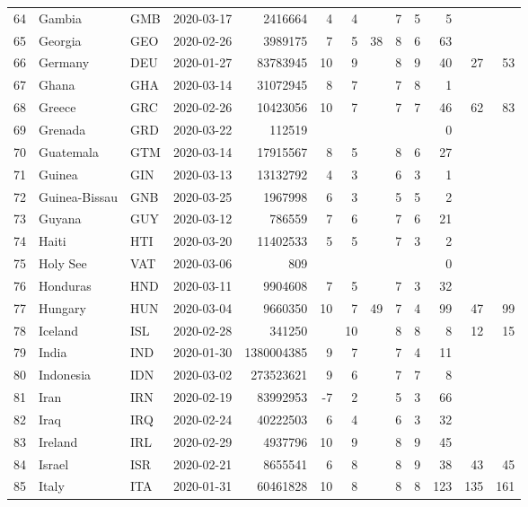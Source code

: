 \begin{longtable}{rlllrrrrrrrrr}
  64 & Gambia & GMB & 2020-03-17 & 2416664 & 4 & 4 &  & 7 & 5 & 5 &  &  \\ 
  65 & Georgia & GEO & 2020-02-26 & 3989175 & 7 & 5 & 38 & 8 & 6 & 63 &  &  \\ 
  66 & Germany & DEU & 2020-01-27 & 83783945 & 10 & 9 &  & 8 & 9 & 40 & 27 & 53 \\ 
  67 & Ghana & GHA & 2020-03-14 & 31072945 & 8 & 7 &  & 7 & 8 & 1 &  &  \\ 
  68 & Greece & GRC & 2020-02-26 & 10423056 & 10 & 7 &  & 7 & 7 & 46 & 62 & 83 \\ 
  69 & Grenada & GRD & 2020-03-22 & 112519 &  &  &  &  &  & 0 &  &  \\ 
  70 & Guatemala & GTM & 2020-03-14 & 17915567 & 8 & 5 &  & 8 & 6 & 27 &  &  \\ 
  71 & Guinea & GIN & 2020-03-13 & 13132792 & 4 & 3 &  & 6 & 3 & 1 &  &  \\ 
  72 & Guinea-Bissau & GNB & 2020-03-25 & 1967998 & 6 & 3 &  & 5 & 5 & 2 &  &  \\ 
  73 & Guyana & GUY & 2020-03-12 & 786559 & 7 & 6 &  & 7 & 6 & 21 &  &  \\ 
  74 & Haiti & HTI & 2020-03-20 & 11402533 & 5 & 5 &  & 7 & 3 & 2 &  &  \\ 
  75 & Holy See & VAT & 2020-03-06 & 809 &  &  &  &  &  & 0 &  &  \\ 
  76 & Honduras & HND & 2020-03-11 & 9904608 & 7 & 5 &  & 7 & 3 & 32 &  &  \\ 
  77 & Hungary & HUN & 2020-03-04 & 9660350 & 10 & 7 & 49 & 7 & 4 & 99 & 47 & 99 \\ 
  78 & Iceland & ISL & 2020-02-28 & 341250 &  & 10 &  & 8 & 8 & 8 & 12 & 15 \\ 
  79 & India & IND & 2020-01-30 & 1380004385 & 9 & 7 &  & 7 & 4 & 11 &  &  \\ 
  80 & Indonesia & IDN & 2020-03-02 & 273523621 & 9 & 6 &  & 7 & 7 & 8 &  &  \\ 
  81 & Iran & IRN & 2020-02-19 & 83992953 & -7 & 2 &  & 5 & 3 & 66 &  &  \\ 
  82 & Iraq & IRQ & 2020-02-24 & 40222503 & 6 & 4 &  & 6 & 3 & 32 &  &  \\ 
  83 & Ireland & IRL & 2020-02-29 & 4937796 & 10 & 9 &  & 8 & 9 & 45 &  &  \\ 
  84 & Israel & ISR & 2020-02-21 & 8655541 & 6 & 8 &  & 8 & 9 & 38 & 43 & 45 \\ 
  85 & Italy & ITA & 2020-01-31 & 60461828 & 10 & 8 &  & 8 & 8 & 123 & 135 & 161 \\ 

\end{longtable}

